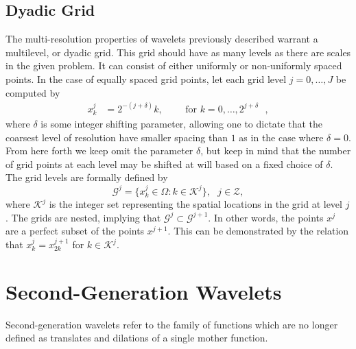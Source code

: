 \documentclass[11pt]{article}
\begin{document}
\subsection{Dyadic Grid}
The multi-resolution properties of wavelets previously described warrant a multilevel, or dyadic grid.
This grid should have as many levels as there are scales in the given problem. It can consist of 
either uniformly or non-uniformly spaced points. In the case of equally spaced grid points, 
let each grid level $j = 0, \dots, J$ be computed by 
\begin{align}
x^{j}_{k} &= 2^{-(j+\delta)} k,\text{ } \text{ } \text{ }  \text{ for $k=0,\dots,2^{j+\delta}$ },
\end{align}
where $\delta$ is some integer shifting parameter, allowing one to dictate that the coarsest level of resolution have 
smaller spacing than $1$ as in the case where $\delta=0$. From here forth we keep omit the parameter $\delta$, but keep
in mind that the number of grid points at each level may be shifted at will based on a fixed choice of $\delta$. 
The grid levels are formally defined by 
\begin{equation}
    \mathcal{G}^j= \{ x_{k}^{j} \in \Omega : k \in \mathcal{K}^j \}, \text{ } j \in \mathcal{Z},
\end{equation}
where $\mathcal{K}^{j}$ is the integer set representing the spatial locations in the grid at level $j$. The grids are 
nested, implying that $\mathcal{G}^{j} \subset \mathcal{G}^{j+1}$. In other words, the points $x^{j}$ are a perfect 
subset of the points $x^{j+1}$. This can be demonstrated by the relation that 
$x_{k}^{j}=x_{2k}^{j+1}$ for $k \in \mathcal{K}^{j}$.

\section{Second-Generation Wavelets}
Second-generation wavelets refer to the family of functions which are no longer defined as translates and dilations of 
a single mother function. 
\end{document}
